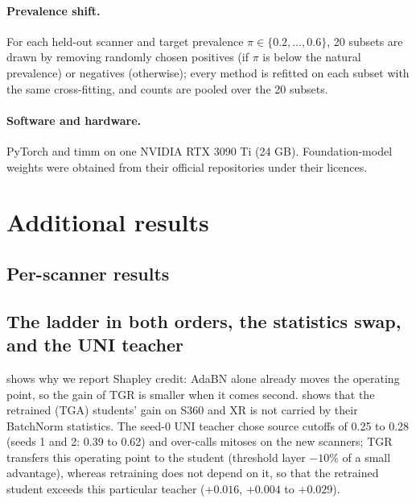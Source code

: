 \paragraph{Prevalence shift.} For each held-out scanner and target prevalence $\pi\in\{0.2,\dots,0.6\}$, 20 subsets are
drawn by removing randomly chosen positives (if $\pi$ is below the natural prevalence) or negatives (otherwise); every
method is refitted on each subset with the same cross-fitting, and counts are pooled over the 20 subsets.

\paragraph{Software and hardware.} PyTorch and timm on one NVIDIA RTX 3090 Ti (24 GB). Foundation-model weights were
obtained from their official repositories under their licences.

\FloatBarrier
\section{Additional results}

\FloatBarrier
\subsection{Per-scanner results}
\label{app:perscanner}


\FloatBarrier
\subsection{The ladder in both orders, the statistics swap, and the UNI teacher}
\label{app:ladder}

 shows why we report Shapley credit: AdaBN alone already moves the operating point, so the
gain of TGR is smaller when it comes second.  shows that the retrained (TGA) students' gain on
S360 and XR is not carried by their BatchNorm statistics. The seed-0 UNI teacher chose source cutoffs of 0.25 to 0.28
(seeds 1 and 2: 0.39 to 0.62) and over-calls mitoses on the new scanners; TGR transfers this operating point to the
student (threshold layer $-10\%$ of a small advantage), whereas retraining does not depend on it, so that the retrained
student exceeds this particular teacher ($+0.016$, $+0.004$ to $+0.029$).




\FloatBarrier
